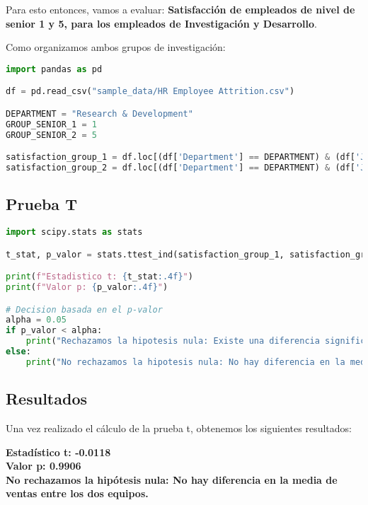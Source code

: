 Para esto entonces, vamos a evaluar: \textbf{Satisfacción de empleados de nivel de senior 1 y 5,
para los empleados de Investigación y Desarrollo}.

Como organizamos ambos grupos de investigación:

\begin{lstlisting}[language=Python]
import pandas as pd

df = pd.read_csv("sample_data/HR Employee Attrition.csv")

DEPARTMENT = "Research & Development"
GROUP_SENIOR_1 = 1
GROUP_SENIOR_2 = 5

satisfaction_group_1 = df.loc[(df['Department'] == DEPARTMENT) & (df['JobLevel'] == GROUP_SENIOR_1), 'JobSatisfaction']
satisfaction_group_2 = df.loc[(df['Department'] == DEPARTMENT) & (df['JobLevel'] == GROUP_SENIOR_2),  'JobSatisfaction']
\end{lstlisting}

\subsection{Prueba T}

\begin{lstlisting}[language=Python]
import scipy.stats as stats

t_stat, p_valor = stats.ttest_ind(satisfaction_group_1, satisfaction_group_2)

print(f"Estadistico t: {t_stat:.4f}")
print(f"Valor p: {p_valor:.4f}")

# Decision basada en el p-valor
alpha = 0.05
if p_valor < alpha:
    print("Rechazamos la hipotesis nula: Existe una diferencia significativa en la media de ventas entre los dos equipos.")
else:
    print("No rechazamos la hipotesis nula: No hay diferencia en la media de ventas entre los dos equipos.")    
\end{lstlisting}


\subsection{Resultados}
Una vez realizado el cálculo de la prueba t, obtenemos los siguientes resultados:

\textbf{Estadístico t: -0.0118}
\\
\textbf{Valor p: 0.9906}
\\
\textbf{No rechazamos la hipótesis nula: No hay diferencia en la media de ventas entre los dos equipos.}